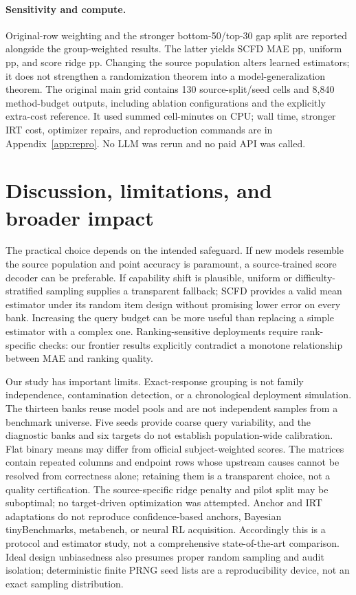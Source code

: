 \documentclass{article}
\begin{document}
\paragraph{Sensitivity and compute.}
Original-row weighting and the stronger bottom-50/top-30 gap split are reported alongside the group-weighted results. The latter yields SCFD MAE \GapSCFD{} pp, uniform \GapUniform{} pp, and score ridge \GapRidge{} pp. Changing the source population alters learned estimators; it does not strengthen a randomization theorem into a model-generalization theorem. The original main grid contains 130 source-split/seed cells and 8,840 method-budget outputs, including ablation configurations and the explicitly extra-cost reference. It used \CoreCellMinutes{} summed cell-minutes on CPU; wall time, stronger IRT cost, optimizer repairs, and reproduction commands are in Appendix~\ref{app:repro}. No LLM was rerun and no paid API was called.

\section{Discussion, limitations, and broader impact}\label{sec:limitations}
The practical choice depends on the intended safeguard. If new models resemble the source population and point accuracy is paramount, a source-trained score decoder can be preferable. If capability shift is plausible, uniform or difficulty-stratified sampling supplies a transparent fallback; SCFD provides a valid mean estimator under its random item design without promising lower error on every bank. Increasing the query budget can be more useful than replacing a simple estimator with a complex one. Ranking-sensitive deployments require rank-specific checks: our frontier results explicitly contradict a monotone relationship between MAE and ranking quality.

Our study has important limits. Exact-response grouping is not family independence, contamination detection, or a chronological deployment simulation. The thirteen banks reuse model pools and are not independent samples from a benchmark universe. Five seeds provide coarse query variability, and the diagnostic banks and six targets do not establish population-wide calibration. Flat binary means may differ from official subject-weighted scores. The matrices contain repeated columns and endpoint rows whose upstream causes cannot be resolved from correctness alone; retaining them is a transparent choice, not a quality certification. The source-specific ridge penalty and pilot split may be suboptimal; no target-driven optimization was attempted. Anchor and IRT adaptations do not reproduce confidence-based anchors, Bayesian tinyBenchmarks, metabench, or neural RL acquisition. Accordingly this is a protocol and estimator study, not a comprehensive state-of-the-art comparison. Ideal design unbiasedness also presumes proper random sampling and audit isolation; deterministic finite PRNG seed lists are a reproducibility device, not an exact sampling distribution.
\end{document}
